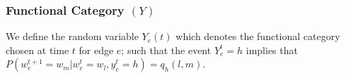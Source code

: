 \documentclass{bioinfo}
\begin{document}
\begin{methods}
\subsubsection{Functional Category $(Y)$}   We define the random
variable $Y_{e}(t)$ which denotes the functional category 
chosen at time $t$ for edge $e$; such that the event $Y_e^t = h$
implies that $P(w_e^{t+1}= w_m | w^t_e =w_l, y_e^t = h) = q_h(l,
m)$. 


\end{methods}
\end{document}
